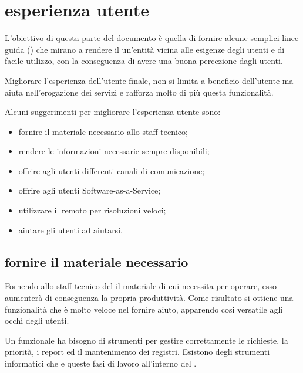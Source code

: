 %
%
\section[Esperienza utente]{esperienza utente}
\label{sd-users-experience}
L'obiettivo di questa parte del documento è quella di fornire alcune semplici linee guida () che mirano a rendere il  un'entità vicina alle esigenze degli utenti e di facile utilizzo, con la conseguenza di avere una buona percezione dagli utenti.

Migliorare l'esperienza dell'utente finale, non si limita a beneficio dell'utente ma aiuta nell'erogazione dei servizi e rafforza molto di più questa funzionalità.

Alcuni suggerimenti per migliorare l'esperienza utente sono:

\begin{itemize}
\item{fornire il materiale necessario allo staff tecnico;}
\item{rendere le informazioni necessarie sempre disponibili;}
\item{offrire agli utenti differenti canali di comunicazione;}
\item{offrire agli utenti  \acs{Software-as-a-Service};}
\item{utilizzare il  remoto per risoluzioni veloci;}
\item{aiutare gli utenti ad aiutarsi.}
\end{itemize}

\subsection[Fornire il materiale necessario]{fornire il materiale necessario}
Fornendo allo staff tecnico del  il materiale di cui necessita per operare, esso aumenterà di conseguenza la propria produttività. Come risultato si ottiene una funzionalità che è molto veloce nel fornire aiuto, apparendo cosi versatile agli occhi degli utenti.

Un  funzionale ha bisogno di strumenti per gestire correttamente le richieste, la priorità, i report ed il mantenimento dei registri. Esistono degli strumenti informatici che  e  queste fasi di lavoro all'interno del .

